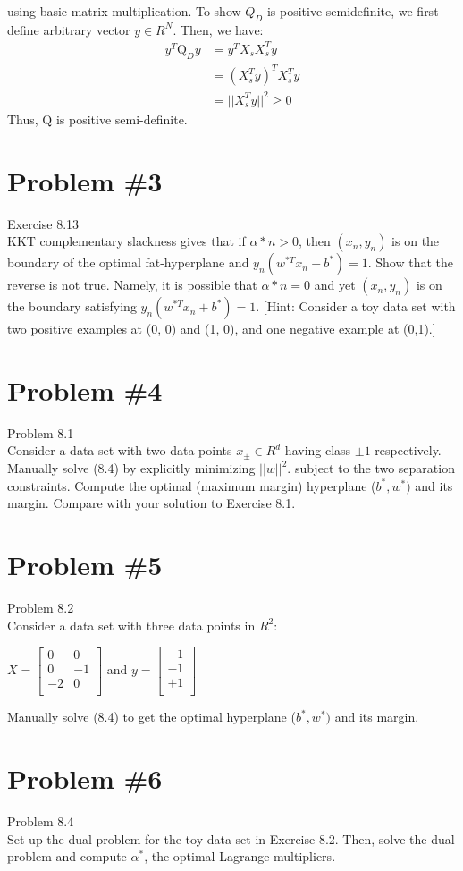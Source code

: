\documentclass[12pt]{article}
\begin{document}
	using basic matrix multiplication.
	To show $Q_D$ is positive semidefinite, we first define arbitrary vector $y \in R^N$. Then, we have:
	\begin{align*}
		y^T \text{Q}_D y &= y^T X_sX_s^Ty \\
		&= (X_s^Ty)^T X_s^Ty\\
		&= ||X_s^Ty||^2 \ge 0
	\end{align*}
	Thus, Q is positive semi-definite.
	\section*{Problem \#3}
	Exercise 8.13 \\
	KKT complementary slackness gives that if $\alpha*n > 0$, then $(x_n , y_n)$ is on
	the boundary of the optimal fat-hyperplane and $y_n (w^{*T} x_n + b^{*} ) = 1$.
	Show that the reverse is not true. Namely, it is possible that $\alpha * n=0$ and
	yet $(x_n , y_n)$ is on the boundary satisfying $y_n (w^{*T} x_n + b^{*} ) = 1$.
	[Hint: Consider a toy data set with two positive examples at (0, 0) and
	(1, 0), and one negative example at (0,1).]
	
	\section*{Problem \#4}
	Problem 8.1 \\
	Consider a data set with two data points $x_{\pm} \in R^d$ having class $\pm1$ respectively. Manually solve (8.4) by explicitly minimizing $||w||^2$.
	subject to the two separation constraints.
	Compute the optimal (maximum margin) hyperplane ($b^* , w^* )$ and its margin.
	Compare with your solution to Exercise 8.1.
	
	\section*{Problem \#5}
	Problem 8.2 \\
	Consider a data set with three data points in $R^2$: \\
	\begin{center}
		$X = \left[
		\begin{array}{cc}
		0 & 0 \\
		0 &-1 \\
		-2 & 0 \\
		\end{array}
		\right]$ and $y = \left[ 
		\begin{array}{c}
		-1\\
		-1\\
		+1\\
		\end{array} \right]$
	\end{center}
	Manually solve (8.4) to get the optimal hyperplane ($b^* , w^* )$ and its margin.
	
	\section*{Problem \#6}
	Problem 8.4 \\
	Set up the dual problem for the toy data set in Exercise 8.2. Then, solve the dual problem and compute $\alpha^*$, the optimal Lagrange
	multipliers.
	
\end{document}
